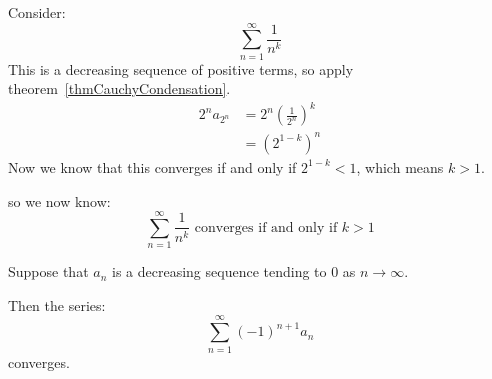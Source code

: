 \documentclass[../Main.tex]{subfiles}
\begin{document}
\begin{example}
    Consider:
    \begin{equation*}
        \sum_{n=1}^\infty \frac{1}{n^k}
    \end{equation*}
    This is a decreasing sequence of positive terms, so apply theorem~\ref{thmCauchyCondensation}.
    \begin{align*}
        2^n a_{2^n} &= 2^n \left(\frac{1}{2^n}\right)^k \\
        &= \left(2^{1-k}\right)^n
    \end{align*}
    Now we know that this converges if and only if $2^{1-k} < 1$, which means $k > 1$.\par
    so we now know:
    \begin{equation}
        \sum_{n=1}^\infty \frac{1}{n^k} \text{ converges if and only if } k > 1
        \label{eqnSumOfPowerReciprocals}
    \end{equation}
\end{example}
\begin{theorem}
    Suppose that $a_n$ is a decreasing sequence tending to 0 as $n \to \infty$.\par
    Then the series:
    \begin{equation*}
        \sum_{n=1}^\infty (-1)^{n+1} a_n
    \end{equation*}
    converges.
    \label{thmAlternatingSeriesTest}
\end{theorem}
\end{document}

